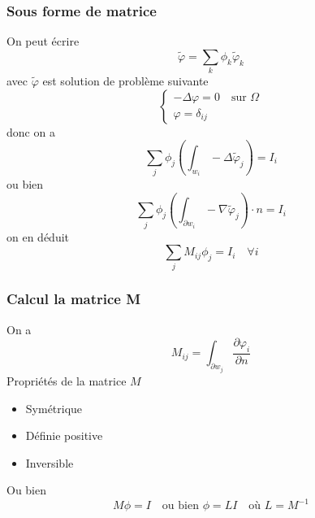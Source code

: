 \begin{frame}
\frametitle{Sous forme de matrice}
On peut \'ecrire
 \begin{equation}
   \tilde\varphi = \sum_k \phi_k \tilde{\varphi}_k
 \end{equation}
 avec $\tilde{\varphi}$ est solution de probl\`eme suivante
 \begin{equation}
   \label{eq:2}
 \begin{cases}
 -\Delta{\varphi} = 0 \quad \text{sur } \Omega \\
 {\varphi} = \delta_{ij}
 \end{cases}
 \end{equation}
 donc on a
 \begin{equation}
 \sum_j \phi_j \left( \int_{w_i}-\Delta\tilde{\varphi}_j \right) =I_i
 \end{equation}
 ou bien
 \begin{equation}
  \sum_j \phi_j \left( \int_{\partial w_i}-\nabla\tilde{\varphi}_j \right) \cdot n =I_i
 \end{equation}
 on en d\'eduit
  \begin{equation}
  \sum_j M_{ij}\phi_j =I_i \quad \forall i
 \end{equation}
%


\end{frame}

 \begin{frame}
\frametitle{Calcul la matrice M}
On a
\begin{equation}
  \label{eq:3}
  M_{ij} = \int_{\partial w_j} \frac{\partial\varphi_i}{\partial n}
\end{equation}
 Propri\'et\'es de la matrice $M$
 \begin{itemize}
 \item Sym\'etrique
 \item D\'efinie positive
 \item Inversible
 \end{itemize}
 Ou bien
\begin{equation}
  \label{eq:4}
  M\phi =I \quad \text{ou bien } \phi =LI \quad \text{o\`u } L=M^{-1}
\end{equation}


\end{frame}

